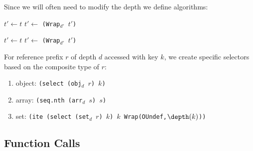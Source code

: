 Since we will often need to modify the depth we define algorithms:
\begin{center}
  \begin{minipage}{0.44\textwidth}
    \begin{algorithm}[H]
      \caption{Wrap(t,d)}\label{alg:wrap}
    \BlankLine
    $t' \leftarrow t$\;
     {
    }
     {
      $t' \leftarrow$ \texttt{(Wrap$_{d'}$ $t'$)}
    }
    \end{algorithm}
  \end{minipage}
  \hfill
  \begin{minipage}{0.44\textwidth}
    \begin{algorithm}[H]
      \caption{Unwrap(t,d)}\label{alg:unwrap}
    \BlankLine
    $t' \leftarrow t$\;
     {
      $t' \leftarrow$ \texttt{(Wrap$_{d'}$ $t'$)} 
    }
    \end{algorithm}
  \end{minipage}
\end{center}


For reference prefix $r$ of depth $d$ accessed with key $k$, we create specific selectors based on the composite type of $r$:
\begin{enumerate}
  \item object: \texttt{(select (obj$_d$ $r$) $k$)}
  \item array: \texttt{(seq.nth (arr$_d$ $s$) $s$)}
  \item set: \texttt{(ite (select (set$_d$ $r$) $k$) $k$ \texttt{Wrap(OUndef,$\depth(k)$)})}
\end{enumerate}

\subsection{Function Calls}
\label{ss:func:t}

